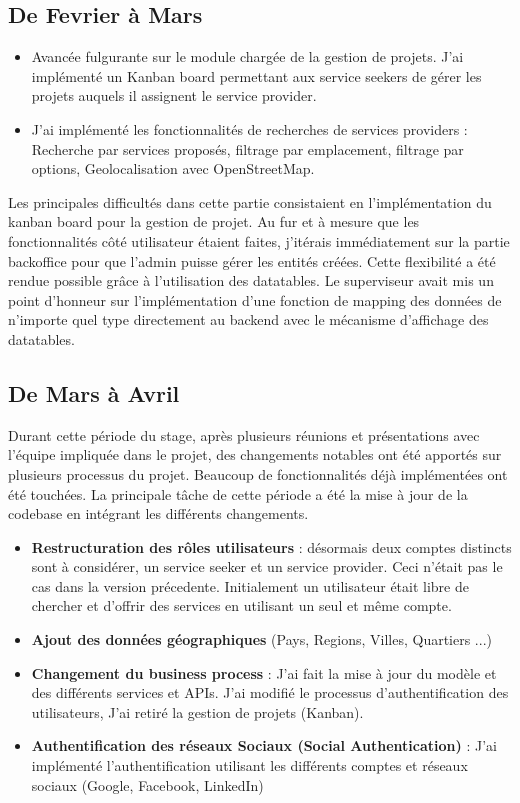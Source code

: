 {\subsection*{De Fevrier à Mars}

\begin{itemize} 
    \item Avancée fulgurante sur le module chargée de la gestion de projets. J'ai implémenté un Kanban board permettant aux service seekers de gérer les projets auquels il assignent le service provider.
    \item J'ai implémenté les fonctionnalités de recherches de services providers : Recherche par services proposés, filtrage par emplacement, filtrage par options, Geolocalisation avec OpenStreetMap.
\end{itemize}

\vspace{1cm}
Les principales difficultés dans cette partie consistaient en l'implémentation du kanban board pour la gestion de projet. Au fur et à mesure que les fonctionnalités côté utilisateur étaient faites, j'itérais immédiatement sur la partie backoffice pour que l'admin puisse gérer les entités créées. Cette flexibilité a été rendue possible grâce à l'utilisation des datatables. Le superviseur avait mis un point d'honneur sur l'implémentation d'une fonction de mapping des données de n'importe quel type directement au backend avec le mécanisme d'affichage des datatables.

\subsection*{De Mars à Avril}

Durant cette période du stage, après plusieurs réunions et présentations avec l'équipe impliquée dans le projet, des changements notables ont été apportés sur plusieurs processus du projet. Beaucoup de fonctionnalités déjà implémentées ont été touchées. La principale tâche de cette période a été la mise à jour de la codebase en intégrant les différents changements. \\

\begin{itemize}
    \item \textbf{Restructuration des rôles utilisateurs} : désormais deux comptes distincts sont à considérer, un service seeker et un service provider. Ceci n'était pas le cas dans la version précedente. Initialement un utilisateur était libre de chercher et d'offrir des services en utilisant un seul et même compte.
    \item \textbf{Ajout des données géographiques} (Pays, Regions, Villes, Quartiers ...)
    \item \textbf{Changement du business process} : 
    J'ai fait la mise à jour du modèle et des différents services et APIs. J'ai modifié le processus d'authentification des utilisateurs, J'ai retiré la gestion de projets (Kanban).
    \item \textbf{Authentification des réseaux Sociaux (Social Authentication)} : J'ai implémenté l'authentification utilisant les différents comptes et réseaux sociaux (Google, Facebook, LinkedIn)
\end{itemize}

}
